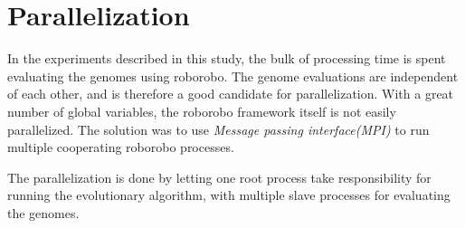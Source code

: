 \chapter{Parallelization}
In the experiments described in this study, the bulk of processing time is spent evaluating the genomes using roborobo.
The genome evaluations are independent of each other, and is therefore a good candidate for parallelization.
With a great number of global variables, the roborobo framework itself is not easily parallelized.
The solution was to use \emph{Message passing interface(MPI)} to run multiple cooperating roborobo processes. 

The parallelization is done by letting one root process take responsibility for running the evolutionary algorithm, with multiple slave processes for evaluating the genomes.

